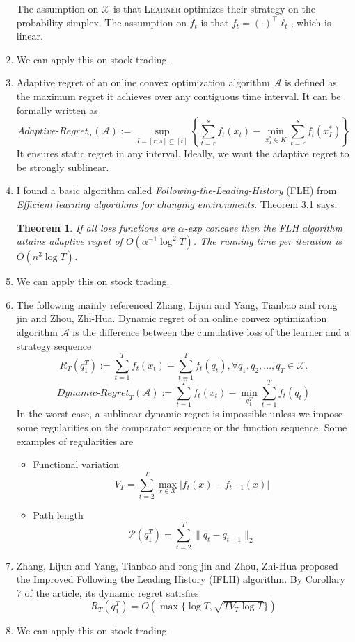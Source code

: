\documentclass[a4paper, 12pt]{article}
\newtheorem{theorem}{Theorem}
\begin{document}
\begin{enumerate}
        The assumption on $\mathscr{X}$ is that \textsc{Learner} optimizes their strategy on the probability simplex. The assumption on $f_t$ is that $f_t = (\cdot)^\top \ell_t$, which is linear.
  \item We can apply this on stock trading.
  \item Adaptive regret of an online convex optimization algorithm $\mathcal{A} $ is defined as the maximum regret it achieves over any contiguous time interval. It can be formally written as
        \[\textit{Adaptive-Regret}_T(\mathcal{A}) := \sup_{I=[r, s] \subseteq [t]} \left\{\sum_{t=r}^s f_t(x_t) - \min_{x_I^*\in K}\sum_{t=r}^s f_t(x_I^*)\right\}\]
        It ensures static regret in any interval. Ideally, we want the adaptive regret to be strongly sublinear.
  \item I found a basic algorithm called \textit{Following-the-Leading-History} (FLH) from \textit{Efficient learning algorithms for changing environments}\cite{hazan2009efficient}. Theorem 3.1 says:
        \begin{theorem}
          If all loss functions are $\alpha$-exp concave then the FLH algorithm attains adaptive regret of $O(\alpha^{-1}\log^2 T)$. The running time per iteration is $O(n^3\log T)$.
        \end{theorem}
  \item We can apply this on stock trading.
  \item The following mainly referenced Zhang, Lijun and Yang, Tianbao and rong jin and Zhou, Zhi-Hua\cite{pmlr-v80-zhang18o}. Dynamic regret of an online convex optimization algorithm $\mathcal{A} $ is the difference between the cumulative loss of the learner and a strategy sequence
        \[R_T(q_1^T) := \sum_{t=1}^T f_t(x_t) - \sum_{t=1}^T f_t(q_t), \forall q_1, q_2, ..., q_T \in \mathscr{X}.\]
        \[\textit{Dynamic-Regret}_T(\mathcal{A}):= \sum_{t=1}^T f_t(x_t) - \min_{q_1^T}\sum_{t=1}^T f_t(q_t)\]
        In the worst case, a sublinear dynamic
        regret is impossible unless we impose some regularities on
        the comparator sequence or the function sequence. Some examples of regularities are
        \begin{itemize}
          \item Functional variation
                \[V_T=\sum_{t=2}^T\max_{x\in\mathscr{X}}|f_t(x)-f_{t-1}(x)|\]
          \item Path length
                \[\mathcal{P}(q_1^T) = \sum_{t=2}^T\parallel q_t-q_{t-1}\parallel_2\]
        \end{itemize}
  \item Zhang, Lijun and Yang, Tianbao and rong jin and Zhou, Zhi-Hua\cite{pmlr-v80-zhang18o} proposed the Improved Following the Leading History (IFLH) algorithm. By Corollary 7 of the article, its dynamic regret satisfies
        \[R_T(q_1^T) = O(\max\{\log T, \sqrt{T V_T \log T}\})\]
  \item We can apply this on stock trading.
\end{enumerate}

\printbibliography
\end{document}

